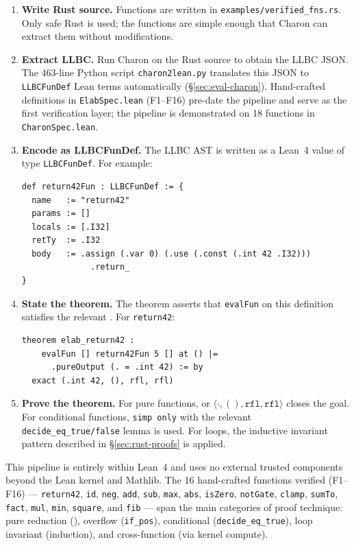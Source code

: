 \begin{enumerate}[leftmargin=1.5em]
  \item \textbf{Write Rust source.} Functions are written in
        \texttt{examples/verified\_fns.rs}. Only safe Rust is used; the
        functions are simple enough that Charon can extract them without
        modifications.

  \item \textbf{Extract LLBC.} Run Charon on the Rust source to obtain the
        LLBC JSON.  The 463-line Python script \texttt{charon2lean.py}
        translates this JSON to \texttt{LLBCFunDef} Lean terms automatically
        (\S\ref{sec:eval-charon}).  Hand-crafted definitions in
        \texttt{ElabSpec.lean} (F1--F16) pre-date the pipeline and serve as
        the first verification layer; the pipeline is demonstrated on 18
        functions in \texttt{CharonSpec.lean}.

  \item \textbf{Encode as LLBCFunDef.} The LLBC AST is written as a Lean~4
        value of type \texttt{LLBCFunDef}. For example:

\begin{lstlisting}[caption={return42 function definition.},label={lst:r42}]
def return42Fun : LLBCFunDef := {
  name   := "return42"
  params := []
  locals := [.I32]
  retTy  := .I32
  body   := .assign (.var 0) (.use (.const (.int 42 .I32)))
              .return_
}
\end{lstlisting}

  \item \textbf{State the theorem.} The theorem asserts that \texttt{evalFun}
        on this definition satisfies the relevant \ProgramSpec. For
        \texttt{return42}:
\begin{lstlisting}
theorem elab_return42 :
    evalFun [] return42Fun 5 [] at () |=
      .pureOutput (. = .int 42) := by
  exact (.int 42, (), rfl, rfl)
\end{lstlisting}

  \item \textbf{Prove the theorem.} For pure functions, \rfl or
        $\langle\cdot, (), \texttt{rfl}, \texttt{rfl}\rangle$ closes the goal.
        For conditional functions, \texttt{simp only} with the relevant
        \texttt{decide\_eq\_true/false} lemma is used. For loops, the
        inductive invariant pattern described in \S\ref{sec:rust-proofs} is
        applied.
\end{enumerate}

This pipeline is entirely within Lean~4 and uses no external trusted components
beyond the Lean kernel and Mathlib. The 16 hand-crafted functions verified
(F1--F16) — \texttt{return42}, \texttt{id}, \texttt{neg}, \texttt{add},
\texttt{sub}, \texttt{max}, \texttt{abs}, \texttt{isZero}, \texttt{notGate},
\texttt{clamp}, \texttt{sumTo}, \texttt{fact}, \texttt{mul}, \texttt{min},
\texttt{square}, and \texttt{fib} — span the main categories of proof technique:
pure reduction (\rfl), overflow (\texttt{if\_pos}), conditional
(\texttt{decide\_eq\_true}), loop invariant (induction), and cross-function
(\rfl via kernel compute).
